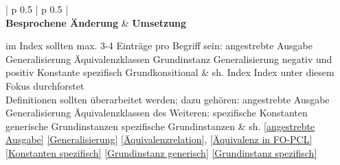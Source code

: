 \documentclass[a4paper, 11pt]{book}
\newlength{\currentLongTableWidth} %
\begin{document}
\setlength{\currentLongTableWidth}{\textwidth} %
\addtolength{\currentLongTableWidth}{-4\tabcolsep} %
\begin{footnotesize}
	\begin{longtable}{ | p {0.5\currentLongTableWidth} | p {0.5\currentLongTableWidth}  |}
		\hline
		\\\hline\hline
		\hline
		\textbf{Besprochene Änderung} 
		& \textbf{Umsetzung} 
		
		
		\endhead
		\hline
		\endfoot
		\endlastfoot
		\hline
		im Index sollten max. 3-4 Einträge pro Begriff sein: \newline angestrebte Ausgabe \newline Generalisierung \newline Äquivalenzklassen \newline Grundinstanz \newline Generalisierung  negativ und positiv \newline Konstante spezifisch \newline Grundkonsitional
		& sh.  Index \newline \newline \newline \newline Index unter diesem Fokus durchforstet\\
		\hline
		Definitionen sollten überarbeitet werden; dazu gehören: \newline angestrebte Ausgabe \newline Generalisierung \newline Äquivalenzklassen \newline des Weiteren: \newline spezifische Konstanten \newline generische Grundinstanzen \newline spezifische Grundinstanzen 
		&  sh. \newline \newline \ref{angestrebte Ausgabe} \newline \ref{Generalisierung} \newline \ref{Äquivalenzrelation}, \ref{Äquivalenz in FO-PCL} \newline \newline \ref{Konstanten spezifisch} \newline \ref{Grundinstanz generisch} \newline \ref{Grundinstanz spezifisch} \\

\end{longtable}
\end{footnotesize}
\end{document}
